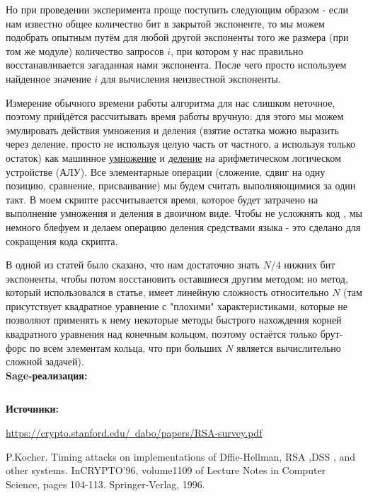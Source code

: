 \documentclass[12pt,a4paper]{scrartcl}
\begin{document}
Но при проведении эксперимента проще поступить следующим образом - если нам известно общее количество бит в закрытой экспоненте, то мы можем подобрать опытным путём для любой другой экспоненты того же размера (при том же модуле) количество запросов $i$, при котором у нас правильно восстанавливается загаданная нами экспонента. После чего просто используем найденное значение $i$ для вычисления неизвестной экспоненты.

Измерение обычного времени работы алгоритма для нас слишком неточное, поэтому прийдётся рассчитывать время работы вручную: для этого мы можем эмулировать действия умножения и деления (взятие остатка можно выразить через деление, просто не используя целую часть от частного, а используя только остаток) как машинное \href{https://yatb.kksctf.ru/}{умножение} и \href{https://yatb.kksctf.ru/}{деление} на арифметическом логическом устройстве (АЛУ). Все элементарные операции (сложение, сдвиг на одну позицию, сравнение, присваивание) мы будем считать выполняющимися за один такт. В моем скрипте рассчитывается время, которое будет затрачено на выполнение умножения и деления в двоичном виде. Чтобы не усложнять код , мы немного блефуем и делаем операцию деления средствами языка - это сделано для сокращения кода скрипта. 

В одной из статей было сказано, что нам достаточно знать $N/4$ нижних бит экспоненты, чтобы потом восстановить оставшиеся другим методом; но метод, который использовался в статье, имеет линейную сложность относительно $N$ (там присутствует квадратное уравнение с "плохими" характеристиками, которые не позволяют применять к нему некоторые методы быстрого нахождения корней квадратного уравнения над конечным кольцом, поэтому остаётся только брут-форс по всем элементам кольца, что при больших $N$ является вычислительно сложной задачей).\\

\textbf{Sage-реализация:}

\inputminted[tabsize=4,obeytabs,fontsize=\footnotesize]{python3}{./RSA_scripts/timing_attack.sage}

\textbf{Источники:}

\href{https://crypto.stanford.edu/~dabo/papers/RSA-survey.pdf}{https://crypto.stanford.edu/~dabo/papers/RSA-survey.pdf}

P.Kocher. Timing attacks on implementations of Dffie-Hellman, RSA ,DSS , and other systems. InCRYPTO'96, volume1109 of Lecture Notes in Computer Science, pages 104-113. Springer-Verlag, 1996.
\end{document}
